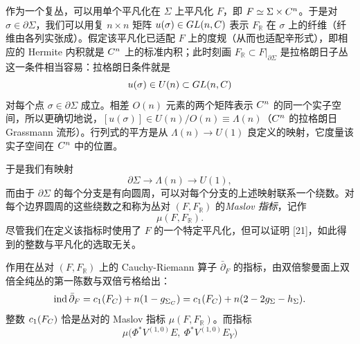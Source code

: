 
作为一个复丛，可以用单个平凡化在 $\Sigma$ 上平凡化 $F$，即 $F\simeq\Sigma\times C^n$。于是对 $\sigma\in\partial\Sigma$，我们可以用复 $n\times n$ 矩阵 $u(\sigma)\in GL(n,C)$ 表示 $F_{\mathbb R}$ 在 $\sigma$ 上的纤维（纤维由各列实张成）。假定该平凡化已适配 $F$ 上的度规（从而也适配辛形式），即相应的 Hermite 内积就是 $C^n$ 上的标准内积；此时刻画 $F_{\mathbb R}\subset F|_{\partial\Sigma}$ 是拉格朗日子丛这一条件相当容易：拉格朗日条件就是
\[
u(\sigma)\in U(n)\subset GL(n,C)
\]
对每个点 $\sigma\in\partial\Sigma$ 成立。相差 $O(n)$ 元素的两个矩阵表示 $C^n$ 的同一个实子空间，所以更确切地说，$[u(\sigma)]\in U(n)/O(n)\equiv\Lambda(n)$（$C^n$ 的拉格朗日 Grassmann 流形）。行列式的平方是从 $\Lambda(n)\to U(1)$ 良定义的映射，它度量该实子空间在 $C^n$ 中的位置。

于是我们有映射
\[
\partial\Sigma\to\Lambda(n)\to U(1),
\]
而由于 $\partial\Sigma$ 的每个分支是有向圆周，可以对每个分支的上述映射联系一个绕数。对每个边界圆周的这些绕数之和称为丛对 $(F,F_{\mathbb R})$ 的\emph{Maslov 指标}，记作
\[
\mu(F,F_{\mathbb R}).
\]
尽管我们在定义该指标时使用了 $F$ 的一个特定平凡化，但可以证明 [21]，如此得到的整数与平凡化的选取无关。



作用在丛对 $(F,F_{\mathbb R})$ 上的 Cauchy-Riemann 算子 $\bar\partial_F$ 的指标，由双倍黎曼面上双倍全纯丛的第一陈数与双倍亏格给出：
\[
\operatorname{ind}\bar\partial_F=c_1(F_{C})+n(1-g_{\Sigma_{C}})=c_1(F_{C})+n(2-2g_\Sigma-h_\Sigma).
\]
整数 $c_1(F_{C})$ 恰是丛对的 Maslov 指标 $\mu(F,F_{\mathbb R})$。而指标
\[
\mu\big(\Phi^*V^{(1,0)}E,\ \Phi^*V^{(1,0)}E_Y\big)
\]


